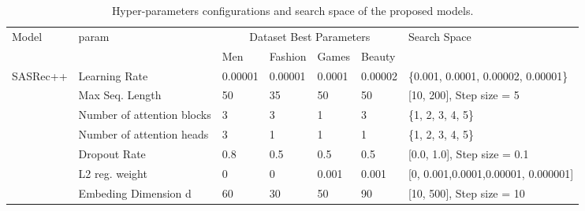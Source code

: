 \documentclass[sigconf,natbib=true]{acmart}
\begin{document}
\begin{table*}[!ht]

\caption{Hyper-parameters configurations and search space of the proposed models.}
\label{hypProp}
\footnotesize
\begin{tabular}{lllllll}
\toprule
\multirow{2}{*}{Model}          & \multirow{2}{*}{param}                                                                      & \multicolumn{4}{c}{Dataset Best Parameters} & \multirow{2}{*}{Search Space}                            \\
                                &                                                                                             & Men        & Fashion   & Games   & Beauty   &                                                          \\
\midrule
\multirow{8}{*}{SASRec++}       & Learning Rate                                                                               & 0.00001    & 0.00001   & 0.0001  & 0.00002  & \{0.001, 0.0001, 0.00002, 0.00001\}                      \\
                                & Max Seq. Length                                                                             & 50         & 35        & 50      & 50       & {[}10, 200{]}, Step size = 5                             \\
                                & Number of attention blocks                                                                  & 3          & 3         & 1       & 3        & \{1, 2, 3, 4, 5\}                                        \\
                                & Number of attention heads                                                                   & 3          & 1         & 1       & 1        & \{1, 2, 3, 4, 5\}                                        \\
                                & Dropout Rate                                                                                & 0.8        & 0.5       & 0.5     & 0.5      & {[}0.0, 1.0{]}, Step size = 0.1                          \\
                                & L2 reg. weight                                                                              & 0          & 0         & 0.001   & 0.001    & {[}0, 0.001,0.0001,0.00001, 0.000001{]}                     \\
                                & Embeding Dimension d                                                                        & 60         & 30        & 50      & 90       & {[}10, 500{]}, Step size = 10                            \\

\end{tabular}
\end{table*}
\end{document}
